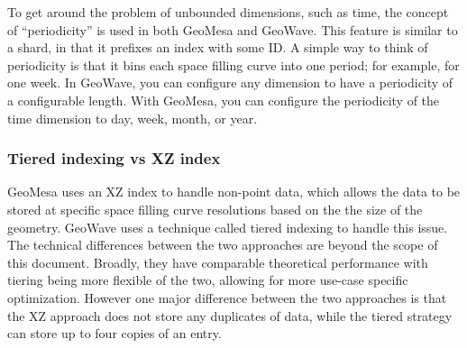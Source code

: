 To get around the problem of unbounded dimensions, such as time, the concept of ``periodicity'' is used in both GeoMesa and GeoWave.
This feature is similar to a shard, in that it prefixes an index with some ID.
A simple way to think of periodicity is that it bins each space filling curve into one period; for example, for one week.
In GeoWave, you can configure any dimension to have a periodicity of a configurable length.
With GeoMesa, you can configure the periodicity of the time dimension to day, week, month, or year.


\subsubsection{Tiered indexing vs XZ index}
\label{sec:featurecompare:indexing:versus}

GeoMesa uses an XZ index to handle non-point data, which allows the data to be stored at specific space filling curve resolutions based on the the size of the geometry.
GeoWave uses a technique called tiered indexing to handle this issue.
The technical differences between the two approaches are beyond the scope of this document.
Broadly, they have comparable theoretical performance with tiering being more flexible of the two, allowing for more use-case specific optimization.
However one major difference between the two approaches is that the XZ approach does not store any duplicates of data, while the tiered strategy can store up to four copies of an entry.

